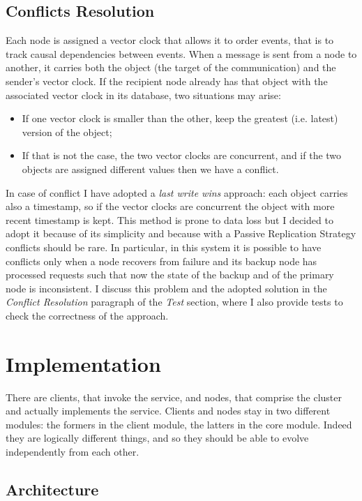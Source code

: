 \documentclass{article}
\begin{document}
\subsection{Conflicts Resolution}
Each node is assigned a vector clock that allows it to order events, that is to track causal dependencies between events. When a message is sent from a node to another, it carries both the object (the target of the communication) and the sender's vector clock. If the recipient node already has that object with the associated vector clock in its database, two situations may arise:
\begin{itemize}
\item  If one vector clock is smaller than the other, keep the greatest (i.e. latest) version of the object;
\item  If that is not the case, the two vector clocks are concurrent, and if the two objects are assigned different values then we have a conflict.
\end{itemize}
In case of conflict I have adopted a \textit{last write wins} approach: each object carries also a timestamp, so if the vector clocks are concurrent the object with more recent timestamp is kept. This method is prone to data loss but I decided to adopt it because of its simplicity and because with a Passive Replication Strategy conflicts should be rare. In particular, in this system it is possible to have conflicts only when a node recovers from failure and its backup node has processed requests such that now the state of the backup and of the primary node is inconsistent. I discuss this problem and the adopted solution in the \textit{Conflict Resolution} paragraph of the \textit{Test} section, where I also provide tests to check the correctness of the approach.



\section{Implementation}  
There are clients, that invoke the service, and nodes, that comprise the cluster and actually implements the service. Clients and nodes stay in two different modules: the formers in the client module, the latters in the core module. Indeed they are logically different things, and so they should be able to evolve independently from each other. 

\subsection{Architecture} 
\end{document}
